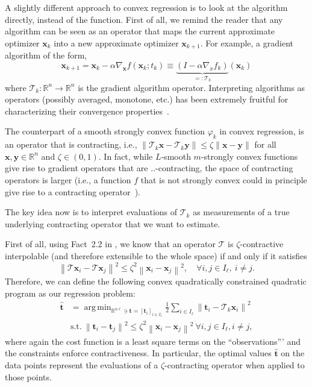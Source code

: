 \documentclass{article}
\DeclareMathOperator*{\argmin}{arg\,min}
\newcommand{\norm}[1]{\left\lVert#1\right\rVert}
\newcommand{\R}{\mathbb{R}}
\newcommand{\tv}{\mathbold{t}}
\newcommand{\x}{\mathbold{x}}
\newcommand{\y}{\mathbold{y}}
\newcommand{\T}{\mathcal{T}}
\begin{document}
A slightly different approach to convex regression is to look at the algorithm directly, instead of the function. First of all, we remind the reader that any algorithm can be seen as an operator that maps the current approximate optimizer $\x_k$ into a new approximate optimizer $\x_{k+1}$. For example, a gradient algorithm of the form,
\begin{equation}
\x_{k+1} = \x_k - \alpha \nabla_{\x} f(\x_k; t_k) \equiv \underbrace{(I - \alpha \nabla_{x}f_k)}_{=:\T_k} (\x_k)
\end{equation}
where $\T_k: \R^n \to \R^n$ is the gradient algorithm operator. Interpreting algorithms as operators (possibly averaged, monotone, etc.) has been extremely fruitful for characterizing their convergence properties~\cite{Rockafellar1976, Eckstein1989, bauschke_convex_2017,Ryu2015,tom-also}.

The counterpart of a smooth strongly convex function $\varphi_k$ in convex regression, is an operator that is contracting, i.e., $\|\T_k \x - \T_k \y\| \leq \zeta \|\x - \y\|$ for all $\x, \y \in \R^n$ and $\zeta \in (0,1)$. In fact, while $L$-smooth $m$-strongly convex functions give rise to gradient operators that are $..$-contracting, the space of contracting operators is larger (i.e., a function $f$ that is not strongly convex could in principle give rise to a contracting operator~\cite{linear}). 

The key idea now is to interpret evaluations of $\T_k$ as measurements of a true underlying contracting operator that we want to estimate. 
 

First of all, using Fact~2.2 in \cite{ryu_operator_2020}, we know that an operator $\T$ is $\zeta$-contractive interpolable (and therefore extensible to the whole space) if and only if it satisfies
\begin{equation}
	\norm{\T \x_i - \T \x_j}^2 \leq \zeta^2 \norm{\x_i - \x_j}^2, \quad \forall i,j \in I_{\ell}, \ i \neq j.
\end{equation}
Therefore, we can define the following convex quadratically constrained quadratic program as our regression problem:
\begin{equation}\label{eq:operator-regression}
\begin{split}
	\hat{\tv} &= \argmin_{ \R^{n\ell} \ni \tv = [\tv_i]_{i \in I_{\ell}}} \frac{1}{2} \sum_{i \in I_{\ell}} \norm{\tv_i - \T_k \x_i}^2 \\
	&\text{s.t.} \ \norm{\tv_i - \tv_j}^2 \leq \zeta^2 \norm{\x_i - \x_j}^2 \ \forall i,j \in I_{\ell}, i \neq j,
\end{split}
\end{equation}
where again the cost function is a least square terms on the ``observations''' and the constraints enforce contractiveness. In particular, the optimal values $\hat{\tv}$ on the data points represent the evaluations of a $\zeta$-contracting operator when applied to those points. 
\end{document}
